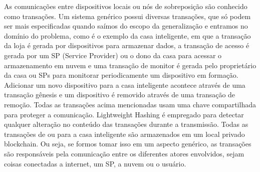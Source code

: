 As comunicações entre dispositivos locais ou nós de sobreposição são conhecido como transações. Um sistema genérico possui diversas transações, que só podem ser mais especificadas quando saímos do escopo da generalização e entramos no domínio do problema, como é o exemplo da casa inteligente, em que a transação da loja é gerada por dispositivos para armazenar dados, a transação de acesso é gerada por um SP (Service Provider) ou o dono da casa para acessar o armazenamento em nuvem e uma transação de monitor é gerada pelo proprietário da casa ou SPs para monitorar periodicamente um dispositivo em formação. Adicionar um novo dispositivo para a casa inteligente acontece através de uma transação gênesis e um dispositivo é removido através de uma transação de remoção. Todas as transações acima mencionadas usam uma chave compartilhada para proteger a comunicação. Lightweight Hashing é empregado para detectar qualquer alteração no conteúdo das transações durante a transmissão. Todas as transações de ou para a casa inteligente são armazenados em um local privado blockchain. Ou seja, se formos tomar isso em um aspecto genérico, as transações são responsáveis pela comunicação entre os diferentes atores envolvidos, sejam coisas conectadas a internet, um SP, a nuvem ou o usuário.

